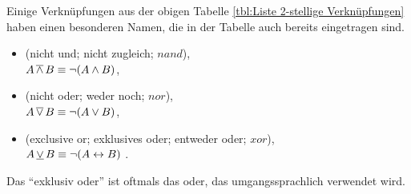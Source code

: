 \begin{Unit}
Einige Verknüpfungen aus der obigen Tabelle 
\ref{tbl:Liste 2-stellige Verknüpfungen} haben einen besonderen Namen, die 
in der Tabelle auch bereits eingetragen sind.

\begin{itemize}

\item \Begriff{$\lnand$} (nicht und; nicht zugleich; 
\textbf{$nand$}), \\
  $A \operatorname{\overline{\wedge}} B \equiv \neg (A \land B)$, 

\item \Begriff{$\lnor$} (nicht oder; weder noch; \textbf{$nor$}), 
  \\
  $A \operatorname{\overline{\vee}} B \equiv \neg (A \lor B)$, 
    
\item \Begriff{$\lxor$} (exclusive or; exklusives oder; entweder oder; 
  \textbf{$xor$}), \\
  $A \operatorname{\underline{\vee}} B \equiv \neg (A \leftrightarrow B)$ .
\end{itemize}

Das \enquote{exklusiv oder} ist oftmals das oder, das umgangssprachlich 
verwendet wird.
\end{Unit}

